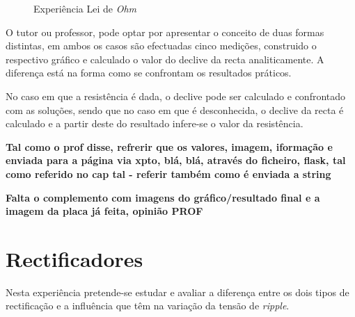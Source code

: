 \begin{figure}[hbtp]
	\centering%
		\centering
		\qquad
		\caption{Experiência Lei de \textit{Ohm}}%
		\label{fig:experienciaOHM}%
	\end{figure}
O tutor ou professor, pode optar por apresentar o conceito de duas formas distintas, em ambos os casos são efectuadas cinco medições, construido o respectivo gráfico e calculado o valor do declive da recta analiticamente. A diferença está na forma como se confrontam os resultados práticos. 

No caso em que a resistência é dada, o declive pode ser calculado e confrontado com as soluções, sendo que no caso em que é desconhecida, o declive da recta é calculado e a partir deste do resultado infere-se o valor da resistência. 

\textbf{Tal como o prof disse, refrerir que os valores, imagem, iformação e enviada para a página via xpto, blá, blá, através do ficheiro, flask, tal como referido no cap tal - referir também como é enviada a string}

\textbf{Falta o complemento com imagens do gráfico/resultado final e a imagem da placa já feita, opinião PROF}


\section{Rectificadores}
Nesta experiência pretende-se estudar e avaliar a diferença entre os dois tipos de rectificação e a influência que têm na variação da tensão de \textit{ripple}. 


